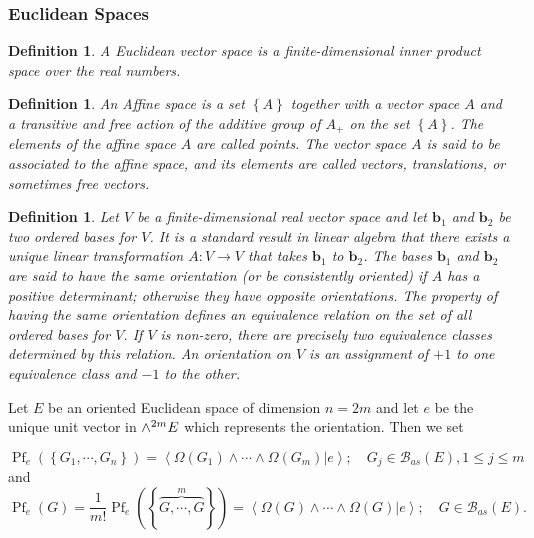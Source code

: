 \documentclass[aps,preprint]{revtex4}%
\newtheorem{definition}[theorem]{Definition}
\begin{document}
\subsubsection{ Euclidean Spaces}

\begin{definition}
A Euclidean vector space is a finite-dimensional inner product space over the
real numbers.
\end{definition}

\begin{definition}
An Affine space is a set $\left\{  A\right\}  $ together with a vector space
$A$ and a transitive and free action of the additive group of $A_{+}$ on the
set $\left\{  A\right\}  $. The elements of the affine space $A$ are called
points. The vector space $A$ is said to be associated to the affine space, and
its elements are called vectors, translations, or sometimes free vectors.
\end{definition}

\begin{definition}
Let $V$ be a finite-dimensional real vector space and let $\mathbf{b}_{1}$ and
$\mathbf{b}_{2}$ be two ordered bases for $V$. It is a standard result in
linear algebra that there exists a unique linear transformation
$A:V\rightarrow V$ that takes $\mathbf{b}_{1}$ to $\mathbf{b}_{2}$. The bases
$\mathbf{b}_{1}$ and $\mathbf{b}_{2}$ are said to have the same orientation
(or be consistently oriented) if $A$ has a positive determinant; otherwise
they have opposite orientations. The property of having the same orientation
defines an equivalence relation on the set of all ordered bases for $V$. If
$V$ is non-zero, there are precisely two equivalence classes determined by
this relation. An orientation on $V$ is an assignment of $+1$ to one
equivalence class and $-1$ to the other.
\end{definition}

Let $E$ be an oriented Euclidean space of dimension $n=2m$ and let $e$ be the
unique unit vector in ${\LARGE \wedge}^{2m}E$ which represents the
orientation. Then we set%

\begin{equation}
\operatorname{Pf}_{e}\left(  \left\{  G_{1},\cdots,G_{n}\right\}  \right)
=\left\langle \left.  \Omega\left(  G_{1}\right)  \wedge\cdots\wedge
\Omega\left(  G_{m}\right)  \right\vert e\right\rangle ;\quad G_{j}%
\in\mathcal{B}_{as}\left(  E\right)  ,1\leq j\leq m
\end{equation}
and
\begin{equation}
\operatorname{Pf}_{e}\left(  G\right)  =\frac{1}{m!}\operatorname{Pf}%
_{e}\left(  \left\{  \overset{m}{\overbrace{G,\cdots,G}}\right\}  \right)
=\left\langle \left.  \Omega\left(  G\right)  \wedge\cdots\wedge\Omega\left(
G\right)  \right\vert e\right\rangle ;\quad G\in\mathcal{B}_{as}\left(
E\right)  .
\end{equation}
\end{document}
